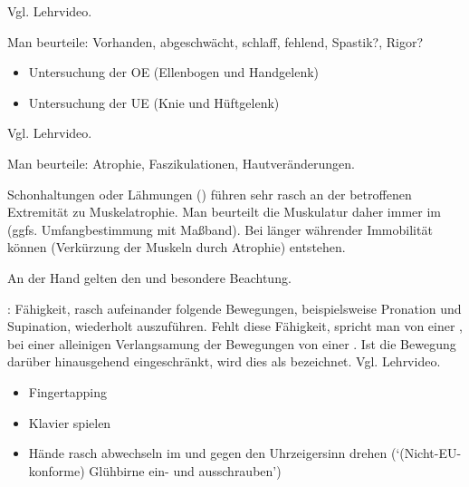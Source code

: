  

{Vgl. Lehrvideo.


Man beurteile: Vorhanden, abgeschwächt, schlaff, fehlend,
Spastik?, Rigor?


\begin{itemize}
  \item Untersuchung der OE (Ellenbogen und
  Handgelenk)
  \item Untersuchung der UE (Knie und Hüftgelenk)
\end{itemize}
}
{}
{}
{}
{}






{Vgl. Lehrvideo.

Man beurteile: Atrophie, Faszikulationen, Hautveränderungen.

Schonhaltungen oder Lähmungen () führen sehr
rasch an der betroffenen Extremität zu Muskelatrophie. Man beurteilt die
Muskulatur daher immer im  (ggfs.
Umfangbestimmung mit Maßband). Bei länger währender
Immobilität können  (Verkürzung der
Muskeln durch Atrophie) entstehen.

An der Hand gelten den  und
 besondere Beachtung.
}
{}
{}
{}
{}



{: Fähigkeit, rasch
aufeinander folgende Bewegungen, beispielsweise Pronation
und Supination, wiederholt auszuführen. Fehlt diese
Fähigkeit, spricht man von einer
, bei einer alleinigen Verlangsamung der Bewegungen von einer
. Ist die Bewegung darüber
hinausgehend eingeschränkt, wird dies als
 bezeichnet.
Vgl. Lehrvideo. 

\begin{itemize}
  \item Fingertapping
  \item Klavier spielen
  \item Hände rasch abwechseln im und gegen den
  Uhrzeigersinn drehen (\enquote*{(Nicht-EU-konforme)
  Glühbirne ein- und ausschrauben})
\end{itemize}
}
{}
{}
{}
{}

